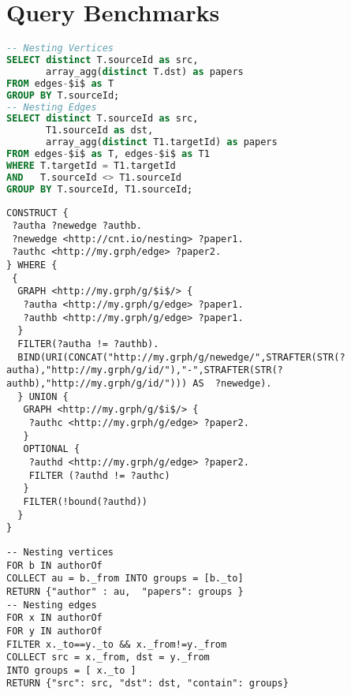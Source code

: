 
\section{Query Benchmarks}
\begin{lstlisting}[caption={Graph Nesting in PostgreSQL's SQL dialect. Two distinct tables are created for both vertices and edges. },language=SQL,frameround=fttt,frame=trBL,mathescape=true,label=SQLNesting]
-- Nesting Vertices
SELECT distinct T.sourceId as src, 
       array_agg(distinct T.dst) as papers 
FROM edges-$i$ as T 
GROUP BY T.sourceId;
-- Nesting Edges
SELECT distinct T.sourceId as src, 
       T1.sourceId as dst, 
       array_agg(distinct T1.targetId) as papers
FROM edges-$i$ as T, edges-$i$ as T1 
WHERE T.targetId = T1.targetId 
AND   T.sourceId <> T1.sourceId 
GROUP BY T.sourceId, T1.sourceId;
\end{lstlisting}


\begin{lstlisting}[caption={Graph Nesting in SPARQL. We use properties to associate to either vertices and edges the nesting content.},language=SPARQL,frameround=fttt,frame=trBL,tabsize=2,mathescape=true,label=SPARQLNesting]
CONSTRUCT {
 ?autha ?newedge ?authb.
 ?newedge <http://cnt.io/nesting> ?paper1.
 ?authc <http://my.grph/edge> ?paper2.
} WHERE {
 {
  GRAPH <http://my.grph/g/$i$/> {
   ?autha <http://my.grph/g/edge> ?paper1.
   ?authb <http://my.grph/g/edge> ?paper1.
  }
  FILTER(?autha != ?authb).
  BIND(URI(CONCAT("http://my.grph/g/newedge/",STRAFTER(STR(?autha),"http://my.grph/g/id/"),"-",STRAFTER(STR(?authb),"http://my.grph/g/id/"))) AS  ?newedge).
  } UNION {
   GRAPH <http://my.grph/g/$i$/> {
    ?authc <http://my.grph/g/edge> ?paper2. 
   }
   OPTIONAL {
    ?authd <http://my.grph/g/edge> ?paper2.
    FILTER (?authd != ?authc)
   }
   FILTER(!bound(?authd))
  }
}
\end{lstlisting}

\begin{lstlisting}[caption={Graph Nesting in ArangoDB using AQL. All the fields marked with an underscore represent externally indexed structures.},language=AQL,frameround=fttt,frame=trBL,tabsize=2,mathescape=true,label=AQLQueryNesting]
-- Nesting vertices
FOR b IN authorOf 
COLLECT au = b._from INTO groups = [b._to] 
RETURN {"author" : au,  "papers": groups }
-- Nesting edges
FOR x IN authorOf 
FOR y IN authorOf 
FILTER x._to==y._to && x._from!=y._from 
COLLECT src = x._from, dst = y._from 
INTO groups = [ x._to ] 
RETURN {"src": src, "dst": dst, "contain": groups}
\end{lstlisting}

